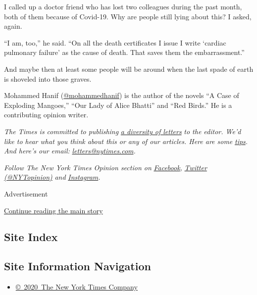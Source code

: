 I called up a doctor friend who has lost two colleagues during the past
month, both of them because of Covid-19. Why are people still lying
about this? I asked, again.

``I am, too,'' he said. ``On all the death certificates I issue I write
`cardiac pulmonary failure' as the cause of death. That saves them the
embarrassment.''

And maybe then at least some people will be around when the last spade
of earth is shoveled into those graves.

Mohammed Hanif
(\href{https://twitter.com/mohammedhanif}{@mohammedhanif}) is the author
of the novels ``A Case of Exploding Mangoes,'' ``Our Lady of Alice
Bhatti'' and ``Red Birds.'' He is a contributing opinion writer.

\emph{The Times is committed to publishing}
\href{https://www.nytimes.com/2019/01/31/opinion/letters/letters-to-editor-new-york-times-women.html}{\emph{a
diversity of letters}} \emph{to the editor. We'd like to hear what you
think about this or any of our articles. Here are some}
\href{https://help.nytimes.com/hc/en-us/articles/115014925288-How-to-submit-a-letter-to-the-editor}{\emph{tips}}\emph{.
And here's our email:}
\href{mailto:letters@nytimes.com}{\emph{letters@nytimes.com}}\emph{.}

\emph{Follow The New York Times Opinion section on}
\href{https://www.facebook.com/nytopinion}{\emph{Facebook}}\emph{,}
\href{http://twitter.com/NYTOpinion}{\emph{Twitter (@NYTopinion)}}
\emph{and}
\href{https://www.instagram.com/nytopinion/}{\emph{Instagram}}\emph{.}

Advertisement

\protect\hyperlink{after-bottom}{Continue reading the main story}

\hypertarget{site-index}{%
\subsection{Site Index}\label{site-index}}

\hypertarget{site-information-navigation}{%
\subsection{Site Information
Navigation}\label{site-information-navigation}}

\begin{itemize}
\tightlist
\item
  \href{https://help.nytimes.com/hc/en-us/articles/115014792127-Copyright-notice}{©~2020~The
  New York Times Company}
\end{itemize}

